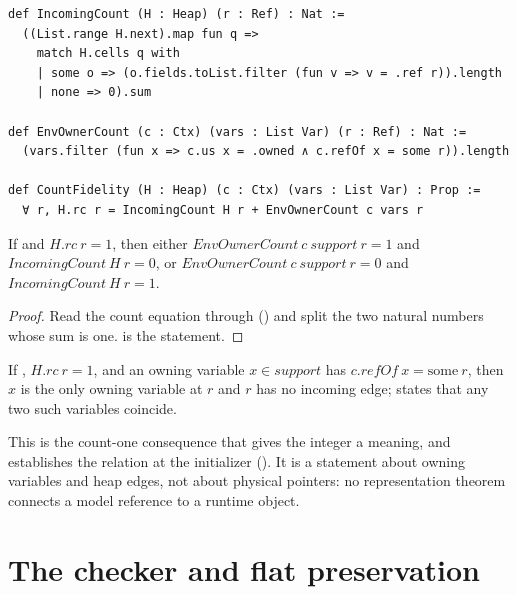\documentclass[a4paper,UKenglish,cleveref]{lipics-v2021}
\begin{document}
\begin{lstlisting}
def IncomingCount (H : Heap) (r : Ref) : Nat :=
  ((List.range H.next).map fun q =>
    match H.cells q with
    | some o => (o.fields.toList.filter (fun v => v = .ref r)).length
    | none => 0).sum

def EnvOwnerCount (c : Ctx) (vars : List Var) (r : Ref) : Nat :=
  (vars.filter (fun x => c.us x = .owned ∧ c.refOf x = some r)).length

def CountFidelity (H : Heap) (c : Ctx) (vars : List Var) : Prop :=
  ∀ r, H.rc r = IncomingCount H r + EnvOwnerCount c vars r
\end{lstlisting}

\begin{lemma}\label{lem:dichotomy}
If  and $H.\mathit{rc}\ r = 1$, then either
$\mathit{EnvOwnerCount}\ c\ \mathit{support}\ r = 1$ and
$\mathit{IncomingCount}\ H\ r = 0$, or
$\mathit{EnvOwnerCount}\ c\ \mathit{support}\ r = 0$ and
$\mathit{IncomingCount}\ H\ r = 1$.
\end{lemma}
\begin{proof}
Read the count equation through  () and split the
two natural numbers whose sum is one.  is the
statement.
\end{proof}

\begin{corollary}\label{cor:unique}
If , $H.\mathit{rc}\ r = 1$, and an owning
variable $x \in \mathit{support}$ has $c.\mathit{refOf}\ x = \mathrm{some}\ r$,
then $x$ is the only owning variable at $r$ and $r$ has no incoming edge;
 states that any two such variables coincide.
\end{corollary}

This is the count-one consequence that gives the integer a meaning, and
 establishes the relation at the initializer
(). It is a statement about owning variables and heap
edges, not about physical pointers: no representation theorem connects a model
reference to a runtime object.

\section{The checker and flat preservation}\label{sec:checker}
\end{document}
